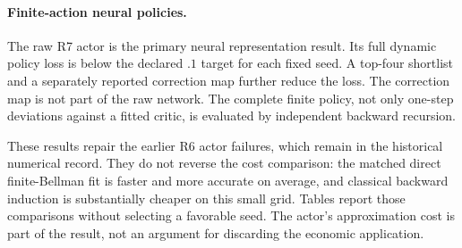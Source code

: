 \paragraph*{Finite-action neural policies.}
The raw R7 actor is the primary neural representation result. Its full dynamic policy loss is below the declared $.1$ target for each fixed seed. A top-four shortlist and a separately reported correction map further reduce the loss. The correction map is not part of the raw network. The complete finite policy, not only one-step deviations against a fitted critic, is evaluated by independent backward recursion.

These results repair the earlier R6 actor failures, which remain in the historical numerical record. They do not reverse the cost comparison: the matched direct finite-Bellman fit is faster and more accurate on average, and classical backward induction is substantially cheaper on this small grid. Tables report those comparisons without selecting a favorable seed. The actor's approximation cost is part of the result, not an argument for discarding the economic application.

